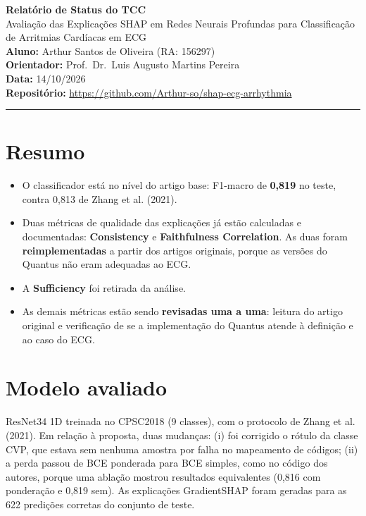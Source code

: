 \documentclass[11pt,a4paper]{article}
\begin{document}
\begin{center}
    {\LARGE \textbf{Relatório de Status do TCC}} \\[0.35em]
    {\large Avaliação das Explicações SHAP em Redes Neurais Profundas para Classificação de Arritmias Cardíacas em ECG} \\[0.3em]
    \textbf{Aluno:} Arthur Santos de Oliveira (RA: 156297) \\[0.2em]
    \textbf{Orientador:} Prof.\ Dr.\ Luis Augusto Martins Pereira \\[0.2em]
    \textbf{Data:} 14/10/2026 \\[0.2em]
    \textbf{Repositório:} \url{https://github.com/Arthur-so/shap-ecg-arrhythmia}
\end{center}
\vspace{-0.5em}
\hrule
\vspace{0.8em}

\section{Resumo}

\begin{itemize}
    \item O classificador está no nível do artigo base: F1-macro de \textbf{0,819} no teste, contra 0,813 de Zhang et al. (2021).
    \item Duas métricas de qualidade das explicações já estão calculadas e documentadas: \textbf{Consistency} e \textbf{Faithfulness Correlation}. As duas foram \textbf{reimplementadas} a partir dos artigos originais, porque as versões do Quantus não eram adequadas ao ECG.
    \item A \textbf{Sufficiency} foi retirada da análise.
    \item As demais métricas estão sendo \textbf{revisadas uma a uma}: leitura do artigo original e verificação de se a implementação do Quantus atende à definição e ao caso do ECG.
\end{itemize}

\section{Modelo avaliado}

ResNet34 1D treinada no CPSC2018 (9 classes), com o protocolo de Zhang et al. (2021). Em relação à proposta, duas mudanças: (i) foi corrigido o rótulo da classe CVP, que estava sem nenhuma amostra por falha no mapeamento de códigos; (ii) a perda passou de BCE ponderada para BCE simples, como no código dos autores, porque uma ablação mostrou resultados equivalentes (0,816 com ponderação e 0,819 sem). As explicações GradientSHAP foram geradas para as 622 predições corretas do conjunto de teste.
\end{document}

